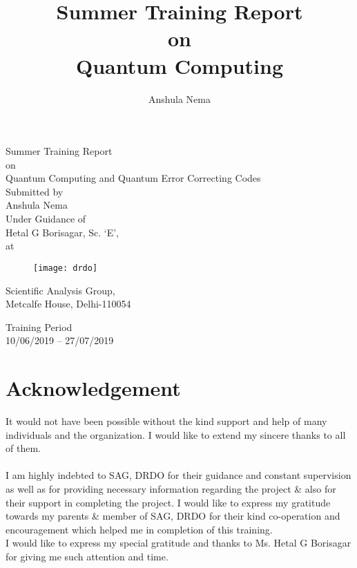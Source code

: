 \documentclass[12pt]{report}
\title{Summer Training Report \\on \\Quantum Computing}
\author{Anshula Nema}
\date{}
\begin{document}
\newpage %
\begin{center}
\thispagestyle{empty} 
{\huge Summer Training Report}\\
{\large on}\\
{\Large Quantum Computing and Quantum Error Correcting Codes}
\\ \vspace{1cm}
{\Large Submitted by}\\ 
{\Large Anshula Nema}\\
\vspace{1cm}
{\Large Under Guidance of} \\
{\Large Hetal G Borisagar, Sc. `E',}\\
{\large at}\\
\begin{figure}[h]
\centering
\texttt{[image: drdo]}
\end{figure}
{\Large Scientific Analysis Group, \\Metcalfe House, Delhi-110054}

\vspace{1cm}
{\Large Training Period} \\
{\Large 10/06/2019 -- 27/07/2019}\\
\end{center} 

\newpage
\chapter*{Acknowledgement} 
It would not have been possible without the kind support and help of many individuals and the organization. I would like to extend my sincere thanks to all of them.\\ \\
I am highly indebted to SAG, DRDO for their guidance and constant supervision as well as for providing necessary information regarding the project \& also for their support in completing the project. I would like to express my gratitude towards my parents \& member of SAG, DRDO for their kind co-operation and encouragement which helped me in completion of this training.\\
I would like to express my special gratitude and thanks to Ms. Hetal G Borisagar for giving me such attention and time.
\end{document}
